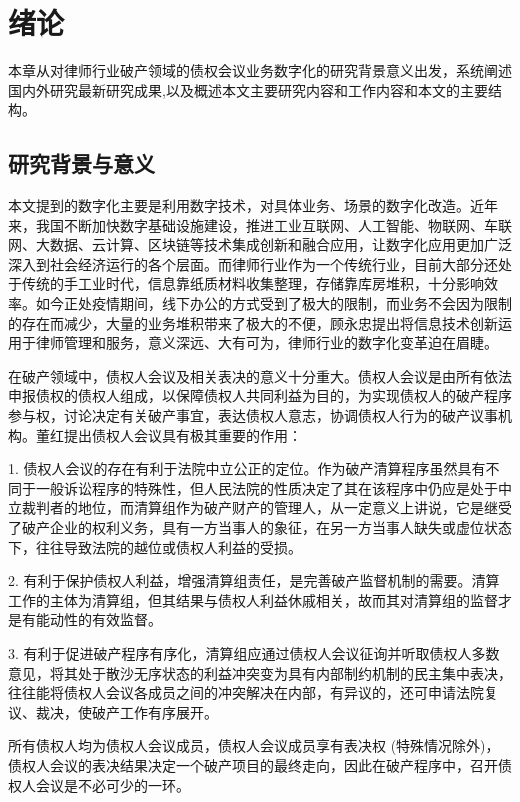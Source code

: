 
\chapter{绪论}
本章从对律师行业破产领域的债权会议业务数字化的研究背景意义出发，系统阐述国内外研究最新研究成果,以及概述本文主要研究内容和工作内容和本文的主要结构。

\section{研究背景与意义}
本文提到的数字化主要是利用数字技术，对具体业务、场景的数字化改造\cite{ShuZiHua}。近年来，我国不断加快数字基础设施建设，推进工业互联网、人工智能、物联网、车联网、大数据、云计算、区块链等技术集成创新和融合应用，让数字化应用更加广泛深入到社会经济运行的各个层面。而律师行业作为一个传统行业，目前大部分还处于传统的手工业时代，信息靠纸质材料收集整理，存储靠库房堆积，十分影响效率。如今正处疫情期间，线下办公的方式受到了极大的限制，而业务不会因为限制的存在而减少，大量的业务堆积带来了极大的不便，顾永忠\cite{Gu}提出将信息技术创新运用于律师管理和服务，意义深远、大有可为，律师行业的数字化变革迫在眉睫。

在破产领域中，债权人会议及相关表决的意义十分重大。债权人会议是由所有依法申报债权的债权人组成，以保障债权人共同利益为目的，为实现债权人的破产程序参与权，讨论决定有关破产事宜，表达债权人意志，协调债权人行为的破产议事机构。董红\cite{Dong}提出债权人会议具有极其重要的作用：

1. 债权人会议的存在有利于法院中立公正的定位。作为破产清算程序虽然具有不同于一般诉讼程序的特殊性，但人民法院的性质决定了其在该程序中仍应是处于中立裁判者的地位，而清算组作为破产财产的管理人，从一定意义上讲说，它是继受了破产企业的权利义务，具有一方当事人的象征，在另一方当事人缺失或虚位状态下，往往导致法院的越位或债权人利益的受损。

2. 有利于保护债权人利益，增强清算组责任，是完善破产监督机制的需要。清算工作的主体为清算组，但其结果与债权人利益休戚相关，故而其对清算组的监督才是有能动性的有效监督。

3. 有利于促进破产程序有序化，清算组应通过债权人会议征询并听取债权人多数意见，将其处于散沙无序状态的利益冲突变为具有内部制约机制的民主集中表决，往往能将债权人会议各成员之间的冲突解决在内部，有异议的，还可申请法院复议、裁决，使破产工作有序展开。

所有债权人均为债权人会议成员，债权人会议成员享有表决权 (特殊情况除外)，债权人会议的表决结果决定一个破产项目的最终走向，因此在破产程序中，召开债权人会议是不必可少的一环。

